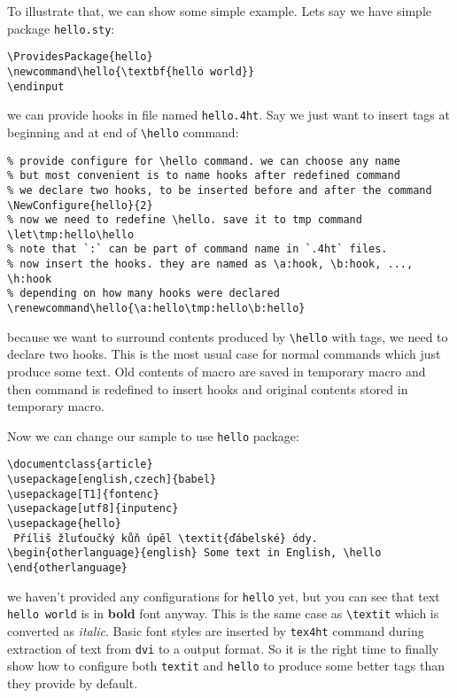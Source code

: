 To illustrate that, we can show some simple example. Lets say we have
simple package \texttt{hello.sty}:

\begin{verbatim}
\ProvidesPackage{hello} 
\newcommand\hello{\textbf{hello world}}
\endinput
\end{verbatim}

we can provide hooks in file named \texttt{hello.4ht}. Say we just want
to insert tags at beginning and at end of \texttt{\textbackslash{}hello}
command:

\begin{verbatim}
% provide configure for \hello command. we can choose any name
% but most convenient is to name hooks after redefined command
% we declare two hooks, to be inserted before and after the command
\NewConfigure{hello}{2}
% now we need to redefine \hello. save it to tmp command
\let\tmp:hello\hello
% note that `:` can be part of command name in `.4ht` files. 
% now insert the hooks. they are named as \a:hook, \b:hook, ..., \h:hook
% depending on how many hooks were declared
\renewcommand\hello{\a:hello\tmp:hello\b:hello} 
\end{verbatim}

because we want to surround contents produced by
\texttt{\textbackslash{}hello} with tags, we need to declare two hooks.
This is the most usual case for normal commands which just produce some
text. Old contents of macro are saved in temporary macro and then
command is redefined to insert hooks and original contents stored in
temporary macro.

Now we can change our sample to use \texttt{hello} package:

\begin{verbatim}
\documentclass{article}
\usepackage[english,czech]{babel} 
\usepackage[T1]{fontenc}
\usepackage[utf8]{inputenc} 
\usepackage{hello}
 Příliš žluťoučký kůň úpěl \textit{ďábelské} ódy.
\begin{otherlanguage}{english} Some text in English, \hello
\end{otherlanguage} 

\end{verbatim}

we haven't provided any configurations for \texttt{hello} yet, but you
can see that text \texttt{hello\ world} is in \textbf{bold} font anyway.
This is the same case as \texttt{\textbackslash{}textit} which is
converted as \emph{italic}. Basic font styles are inserted by
\texttt{tex4ht} command during extraction of text from \texttt{dvi} to a
output format. So it is the right time to finally show how to configure
both \texttt{textit} and \texttt{hello} to produce some better tags than
they provide by default.

